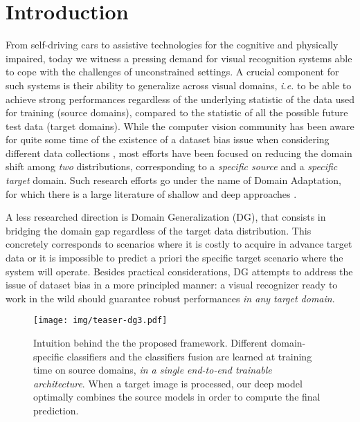 \documentclass{article}
\begin{document}
\section{Introduction}
\label{sec:intro}
\vspace{-0.4cm}
From self-driving cars to assistive technologies for the cognitive and physically impaired, today we witness a pressing demand for visual recognition systems able to cope with the challenges of unconstrained settings. A crucial component for such systems is their ability to generalize across visual domains, \textit{i.e.} to be able to achieve strong performances regardless of the underlying statistic of the data used for training (source domains), compared to the statistic of all the possible future test data (target domains). While the computer vision community has been aware for quite some time of the existence of a dataset bias issue when considering different data collections \cite{khosla2012undoing}, most efforts have been focused on reducing the domain shift among \textit{two} distributions, corresponding to a \textit{specific source} and a \textit{specific target} domain. Such research efforts go under the name of Domain Adaptation, for which there is a large literature of shallow and deep approaches \cite{csurka2017domain,carlucci2017autodial,xu2018deep,mancini2018boosting}.

A less researched direction is {Domain Generalization (DG)}, that consists in bridging the domain gap regardless of the target data distribution. This concretely corresponds to scenarios where it is costly to acquire in advance target data or it is impossible to predict a priori the specific target scenario where the system will operate. Besides practical considerations, DG attempts to address the issue of dataset bias in a more principled manner: a visual recognizer ready to work in the wild should guarantee robust performances \textit{in any target domain}. 

\begin{figure}[t]
\centering
\texttt{[image: img/teaser-dg3.pdf]}
\vspace{-0.3cm}
    \caption{Intuition behind the the proposed framework. Different domain-specific classifiers and the classifiers fusion are learned at training time on source domains, \textit{in a single end-to-end trainable architecture}. When a target image is processed, our deep model optimally combines the source models in order to compute the final prediction.
} 
   \label{fig:idea}
   \vspace{-0.6cm}
\end{figure}
\end{document}
